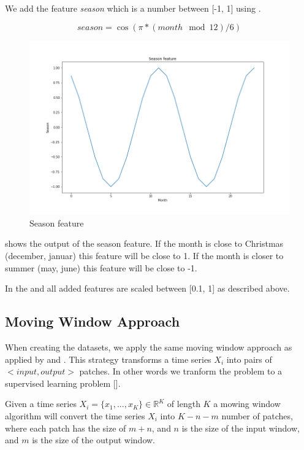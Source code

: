 We add the feature \textit{season} which is a number between [-1, 1] using .

\begin{equation}
  season = \cos(\pi * (month \mod{12}) / 6)
  \label{eq:season_feature}
\end{equation}

\begin{figure}[h!]
  \centering
  \includegraphics[width=\textwidth]{./figs/code_generated/season_feature.png}
  \hfill
  \caption{Season feature}
  \label{fig:season-feature}
\end{figure}

 shows the output of the season feature.
If the month is close to Christmas (december, januar) this feature will be close to 1.
If the month is closer to summer (may, june) this feature will be close to -1.

In the and all added features are scaled between [0.1, 1] as described above.






\subsection{Moving Window Approach}
When creating the datasets, we apply the same moving window approach as applied by \cite{Bandara2019} and \cite{Hewamalage2021}.
This strategy transforms a time series $X_i$ into pairs of $<input, output>$ patches.
In other words we tranform the problem to a supervised learning problem [].

Given a time series $X_i = \{x_1, ..., x_K\} \in \mathbb{R}^K$ of length $K$ a mowing
window algorithm will convert the time series $X_i$ into $K-n-m$ number of patches,
where each patch has the size of $m+n$, and $n$ is the size of the input window,
and $m$ is the size of the output window.


